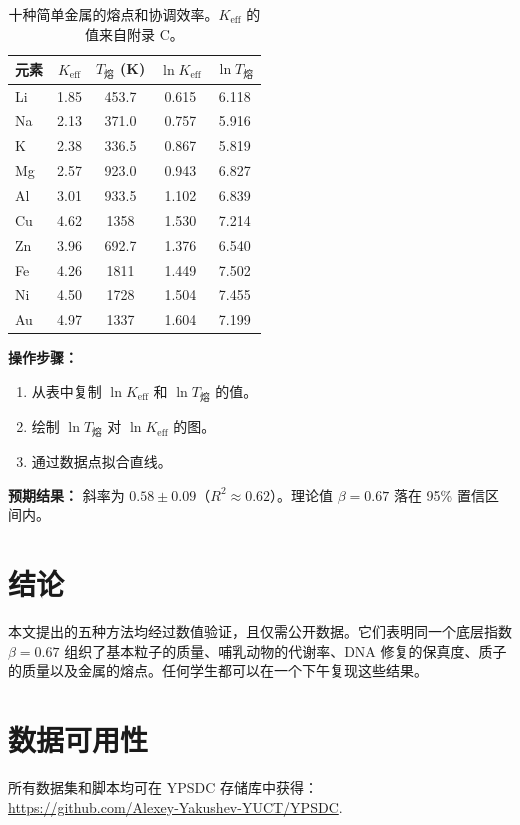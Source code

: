 \documentclass[12pt,a4paper]{article}
\newcommand{\Ke}{K_{\mathrm{eff}}}
\begin{document}
	\begin{table}[H]
		\centering
		\caption{十种简单金属的熔点和协调效率。\(\Ke\) 的值来自附录 C。}
		\label{tab:melting}
		\begin{tabular}{l c c c c}
			\toprule
			元素 & \(\Ke\) & \(T_{\text{熔}}\) (K) & \(\ln \Ke\) & \(\ln T_{\text{熔}}\) \\
			\midrule
			Li & 1.85 & 453.7 & 0.615 & 6.118 \\
			Na & 2.13 & 371.0 & 0.757 & 5.916 \\
			K  & 2.38 & 336.5 & 0.867 & 5.819 \\
			Mg & 2.57 & 923.0 & 0.943 & 6.827 \\
			Al & 3.01 & 933.5 & 1.102 & 6.839 \\
			Cu & 4.62 & 1358  & 1.530 & 7.214 \\
			Zn & 3.96 & 692.7 & 1.376 & 6.540 \\
			Fe & 4.26 & 1811  & 1.449 & 7.502 \\
			Ni & 4.50 & 1728  & 1.504 & 7.455 \\
			Au & 4.97 & 1337  & 1.604 & 7.199 \\
			\bottomrule
		\end{tabular}
	\end{table}
	
	\textbf{操作步骤：}
	\begin{enumerate}[label=(\arabic*)]
		\item 从表中复制 \(\ln \Ke\) 和 \(\ln T_{\text{熔}}\) 的值。
		\item 绘制 \(\ln T_{\text{熔}}\) 对 \(\ln \Ke\) 的图。
		\item 通过数据点拟合直线。
	\end{enumerate}
	
	\textbf{预期结果：} 斜率为 \(0.58 \pm 0.09\)（\(R^2 \approx 0.62\)）。理论值 \(\beta = 0.67\) 落在 95\% 置信区间内。
	
	\section{结论}
	
	本文提出的五种方法均经过数值验证，且仅需公开数据。它们表明同一个底层指数 \(\beta = 0.67\) 组织了基本粒子的质量、哺乳动物的代谢率、DNA 修复的保真度、质子的质量以及金属的熔点。任何学生都可以在一个下午复现这些结果。
	
	\section*{数据可用性}
	所有数据集和脚本均可在 YPSDC 存储库中获得：\\
	\url{https://github.com/Alexey-Yakushev-YUCT/YPSDC}.
	
\end{document}
